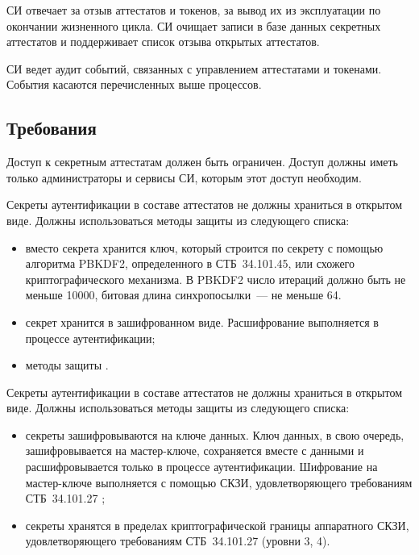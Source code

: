 СИ отвечает за отзыв аттестатов и токенов, за вывод их из эксплуатации по 
окончании жизненного цикла. 
%
СИ очищает записи в базе данных секретных аттестатов и поддерживает список 
отзыва открытых аттестатов.

СИ ведет аудит событий, связанных с управлением аттестатами и токенами. 
События касаются перечисленных выше процессов.

\subsection{Требования}\label{CM.Reqs}

Доступ к секретным аттестатам должен быть ограничен.
Доступ должны иметь только администраторы и сервисы СИ,
которым этот доступ необходим. 

Секреты аутентификации в составе аттестатов не должны храниться в открытом виде. 
Должны использоваться методы защиты из следующего списка:
\begin{itemize}
\item
вместо секрета хранится ключ, который строится по секрету с помощью 
алгоритма PBKDF2, определенного в СТБ~34.101.45, 
или схожего криптографического механизма.
%
В PBKDF2 число итераций должно быть не меньше 10000,
битовая длина синхропосылки~--- не меньше 64.

\item
секрет хранится в зашифрованном виде. Расшифрование 
выполняется в процессе аутентификации;

\item
методы защиты .
\end{itemize}

Секреты аутентификации в составе аттестатов не должны храниться в открытом 
виде. Должны использоваться методы защиты из следующего списка:
\begin{itemize}
\item
секреты зашифровываются на ключе данных. Ключ данных, в свою очередь, 
зашифровывается на мастер-ключе, сохраняется вместе с данными
и расшифровывается только в процессе аутентификации.
%
Шифрование на мастер-ключе выполняется с помощью СКЗИ, удовлетворяющего 
требованиям СТБ~34.101.27 ;

\item
секреты хранятся в пределах криптографической границы аппаратного
СКЗИ, удовлетворяющего требованиям СТБ~34.101.27 (уровни 3, 4).
\end{itemize}

